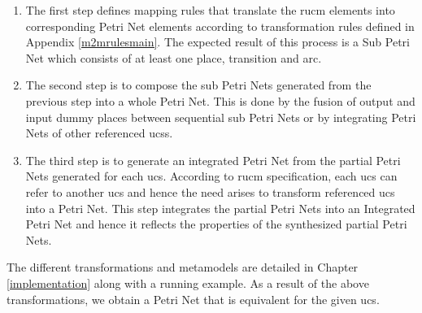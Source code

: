 \begin{enumerate}
\item The first step defines mapping rules that translate the \gls{rucm} elements into corresponding Petri Net elements according to transformation rules defined in Appendix \ref{m2mrulesmain}. The expected result of this process is a Sub Petri Net which consists of at least one place, transition and arc.
\item The second step is to compose the sub Petri Nets generated from the previous step into a whole Petri Net. This is done by the fusion of output and input dummy places between sequential sub Petri Nets or by integrating Petri Nets of other referenced \glspl{ucs}.
\item The third step is to generate an integrated Petri Net from the partial Petri Nets generated for each \gls{ucs}. According to \gls{rucm} specification, each \gls{ucs} can refer to another \gls{ucs} and hence the need arises to transform referenced \gls{ucs} into a Petri Net. This step integrates the partial Petri Nets into an Integrated Petri Net and hence it reflects the properties of the synthesized partial Petri Nets.
\end{enumerate}



The different transformations and metamodels are detailed in Chapter \ref{implementation} along with a running example. As a result of the above transformations, we obtain a Petri Net that is equivalent for the given \gls{ucs}.

